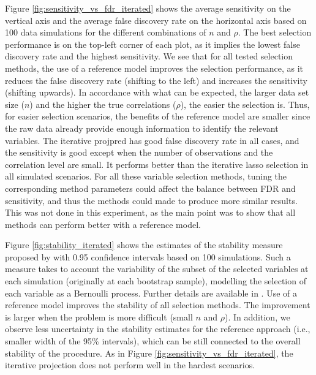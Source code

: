 \documentclass[a4]{article}
\theoremstyle{definition}
\begin{document}
Figure \ref{fig:sensitivity_vs_fdr_iterated} shows the average sensitivity on
the vertical axis and the average false discovery rate on the
horizontal axis based on 100 data simulations for the different
combinations of $n$ and $\rho$. The best selection performance is on the
top-left corner of each plot, as it implies the lowest false discovery
rate and the highest sensitivity. We see that for all tested
selection methods, the use of a reference model improves the
selection performance, as it reduces the false discovery rate (shifting
to the left) and increases the sensitivity (shifting upwards). In
accordance with what can be expected, the larger data set size ($n$) and the higher the true correlations ($\rho$), the easier the
selection is. Thus, for easier selection scenarios, the benefits of
the reference model are smaller since the raw data already provide
enough information to identify the relevant variables. The iterative
projpred has good false discovery rate in all cases, and the
sensitivity is good except when the number of observations and the
correlation level are small. It performs better than the iterative lasso 
selection in all simulated scenarios.
%
For all these variable selection methods, tuning the corresponding
method parameters could affect the balance between FDR and
sensitivity, and thus the methods could made to produce more similar
results. This was not done in this experiment, as the main point was
to show that all methods can perform better with a reference model.

Figure \ref{fig:stability_iterated} shows the estimates of the stability
measure proposed by \cite{paper:stability} with 0.95 confidence
intervals based on 100 simulations. Such a measure takes to account
the variability of the subset of the selected variables at each
simulation (originally at each bootstrap sample), modelling the
selection of each variable as a Bernoulli process. Further details are
available in \cite{paper:stability}. Use of a reference model 
improves the stability of all selection methods. The improvement is 
larger when the problem is more difficult (small $n$ and $\rho$). In
addition, we observe less uncertainty in the stability estimates for
the reference approach (i.e., smaller width of the 95\% intervals),
which can be still connected to the overall stability of the
procedure. As in Figure \ref{fig:sensitivity_vs_fdr_iterated}, the iterative
projection does not perform well in the hardest scenarios. 
\end{document}
